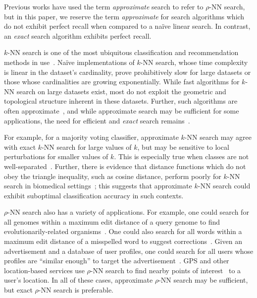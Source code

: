 Previous works have used the term \textit{approximate} search to refer to $\rho$-NN search, but in this paper, we reserve the term \textit{approximate} for search algorithms which do not exhibit perfect recall when compared to a na\"{i}ve linear search.
In contrast, an \textit{exact} search algorithm exhibits perfect recall.

$k$-NN search is one of the most ubiquitous classification and recommendation methods in use~\cite{fix1952discriminatory, cover1967nearest}.
Na\"{i}ve implementations of $k$-NN search, whose time complexity is linear in the dataset's cardinality, prove prohibitively slow for large datasets or those whose cardinalities are growing exponentially.
While fast algorithms for $k$-NN search on large datasets exist, most do not exploit the geometric and topological structure inherent in these datasets.
Further, such algorithms are often approximate~\cite{gao2023high}, and while approximate search may be sufficient for some applications, the need for efficient and \textit{exact} search remains~\cite{ukey2023survey}.

For example, for a majority voting classifier, approximate $k$-NN search may agree with exact $k$-NN search for large values of $k$, but may be sensitive to local perturbations for smaller values of $k$.
This is especially true when classes are not well-separated~\cite{zhang2022imbalanced}.
Further, there is evidence that distance functions which do not obey the triangle inequality, such as cosine distance, perform poorly for $k$-NN search in biomedical settings~\cite{hu2016distance};
this suggests that approximate $k$-NN search could exhibit suboptimal classification accuracy in such contexts.

$\rho$-NN search also has a variety of applications.
For example, one could search for all genomes within a maximum edit distance of a query genome to find evolutionarily-related organisms~\cite{budowski2010fragbag}.
One could also search for all words within a maximum edit distance of a misspelled word to suggest corrections~\cite{ukkonen1985algorithms}.
Given an advertisement and a database of user profiles, one could search for all users whose profiles are ``similar enough'' to target the advertisement~\cite{zhang2020privacy}.
GPS and other location-based services use $\rho$-NN search to find nearby points of interest~\cite{zhang2020privacy} to a user's location.
In all of these cases, approximate $\rho$-NN search may be sufficient, but exact $\rho$-NN search is preferable.

